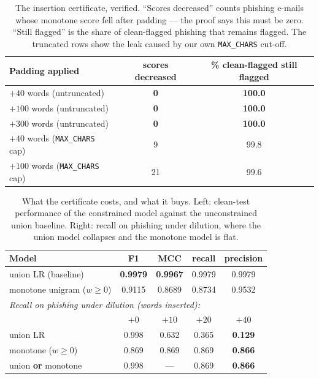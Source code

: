 \documentclass[11pt]{article}
\begin{document}
\begin{table}[t]
\centering
\caption{The insertion certificate, verified. ``Scores decreased'' counts phishing e-mails whose
monotone score fell after padding --- the proof says this must be zero. ``Still flagged'' is the share
of clean-flagged phishing that remains flagged. The truncated rows show the leak caused by our own
\texttt{MAX\_CHARS} cut-off.}
\label{tab:monocert}
\begin{tabular}{lcc}
\toprule
Padding applied & scores decreased & \% clean-flagged still flagged \\
\midrule
$+40$ words (untruncated)   & \textbf{0} & \textbf{100.0} \\
$+100$ words (untruncated)  & \textbf{0} & \textbf{100.0} \\
$+300$ words (untruncated)  & \textbf{0} & \textbf{100.0} \\
$+40$ words (\texttt{MAX\_CHARS} cap)  & 9  & 99.8 \\
$+100$ words (\texttt{MAX\_CHARS} cap) & 21 & 99.6 \\
\bottomrule
\end{tabular}
\end{table}

\begin{table}[t]
\centering
\caption{What the certificate costs, and what it buys. Left: clean-test performance of the constrained
model against the unconstrained union baseline. Right: recall on phishing under dilution, where the
union model collapses and the monotone model is flat.}
\label{tab:monocost}
\begin{tabular}{lcccc}
\toprule
Model & F1 & MCC & recall & precision \\
\midrule
union LR (baseline)            & \textbf{0.9979} & \textbf{0.9967} & 0.9979 & 0.9979 \\
monotone unigram ($w \ge 0$)   & 0.9115 & 0.8689 & 0.8734 & 0.9532 \\
\midrule
\multicolumn{5}{l}{\emph{Recall on phishing under dilution (words inserted):}} \\
\midrule
 & $+0$ & $+10$ & $+20$ & $+40$ \\
union LR                       & 0.998 & 0.632 & 0.365 & \textbf{0.129} \\
monotone ($w \ge 0$)           & 0.869 & 0.869 & 0.869 & \textbf{0.866} \\
union \textbf{or} monotone     & 0.998 & --- & 0.869 & \textbf{0.866} \\
\bottomrule
\end{tabular}
\end{table}
\end{document}
